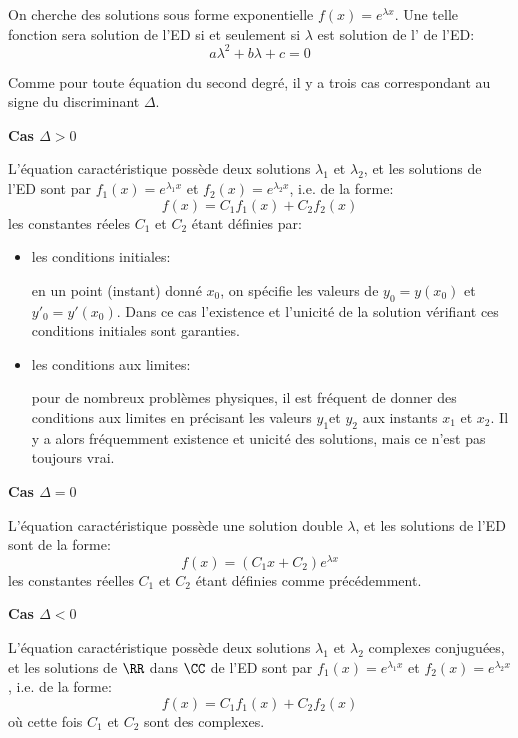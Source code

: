 On cherche des solutions sous forme exponentielle $f(x) = e^{\lambda x}$. 
Une telle fonction sera solution de l'ED si et seulement si $\lambda$ est solution de
l' de l'ED:
\begin{equation}
    a\lambda^2 + b\lambda + c = 0
\end{equation}

Comme pour toute équation du second degré, il y a trois cas correspondant au signe du
discriminant $\Delta$.

\medskip
\textbf{Cas $\Delta>0$}

L'équation caractéristique possède deux solutions $\lambda_1$ et $\lambda_2$, et
les solutions de l'ED sont  par $f_1(x) = e^{\lambda_1x}$ et
$f_2(x) = e^{\lambda_2x}$, i.e. de la forme:
\begin{equation}
f(x) = C_1f_1(x) + C_2f_2(x) 
\end{equation}
les constantes réeles $C_1$ et $C_2$ étant définies par:
\begin{itemize}
   \item les conditions initiales: 

	en un point (instant) donné $x_0$, on spécifie les valeurs de $y_0=y(x_0)$ et $y'_0=y'(x_0)$. 
	Dans ce cas l'existence et l'unicité de la solution vérifiant ces conditions initiales sont garanties.
   \item les conditions aux limites:

	pour de nombreux problèmes physiques, il est fréquent de donner des conditions aux limites en 
	précisant les valeurs $y_1$et $y_2$ aux instants $x_1$ et $x_2$. 
	Il y a alors fréquemment existence et unicité des solutions, mais ce n'est pas toujours vrai.
\end{itemize}

\medskip
\textbf{Cas $\Delta=0$}

L'équation caractéristique possède une solution double $\lambda$, et
les solutions de l'ED sont de la forme:
\begin{equation}
f(x) = (C_1 x + C_2)e^{\lambda x}
\end{equation}
les constantes réelles $C_1$ et $C_2$ étant définies comme précédemment.

\medskip
\textbf{Cas $\Delta<0$}

L'équation caractéristique possède deux solutions $\lambda_1$ et $\lambda_2$
complexes conjuguées, et les solutions de $\RR$ dans $\CC$ de l'ED sont 
 par $f_1(x) = e^{\lambda_1x}$ et
$f_2(x) = e^{\lambda_2x}$, i.e. de la forme:
\begin{equation}
f(x) = C_1f_1(x) + C_2f_2(x) 
\end{equation}
où cette fois $C_1$ et $C_2$ sont des complexes.

